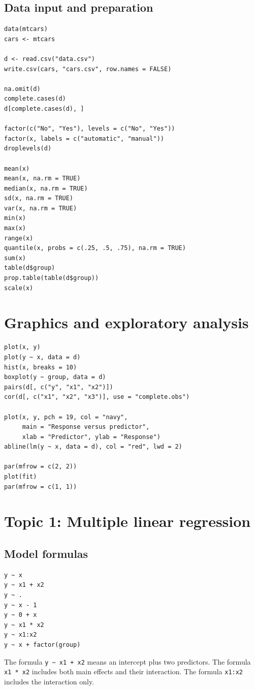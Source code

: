 \documentclass[11pt]{article}
\begin{document}
\subsection{Data input and preparation}
\begin{lstlisting}
data(mtcars)
cars <- mtcars

d <- read.csv("data.csv")
write.csv(cars, "cars.csv", row.names = FALSE)

na.omit(d)
complete.cases(d)
d[complete.cases(d), ]

factor(c("No", "Yes"), levels = c("No", "Yes"))
factor(x, labels = c("automatic", "manual"))
droplevels(d)

mean(x)
mean(x, na.rm = TRUE)
median(x, na.rm = TRUE)
sd(x, na.rm = TRUE)
var(x, na.rm = TRUE)
min(x)
max(x)
range(x)
quantile(x, probs = c(.25, .5, .75), na.rm = TRUE)
sum(x)
table(d$group)
prop.table(table(d$group))
scale(x)
\end{lstlisting}

\section{Graphics and exploratory analysis}

\begin{lstlisting}
plot(x, y)
plot(y ~ x, data = d)
hist(x, breaks = 10)
boxplot(y ~ group, data = d)
pairs(d[, c("y", "x1", "x2")])
cor(d[, c("x1", "x2", "x3")], use = "complete.obs")

plot(x, y, pch = 19, col = "navy",
     main = "Response versus predictor",
     xlab = "Predictor", ylab = "Response")
abline(lm(y ~ x, data = d), col = "red", lwd = 2)

par(mfrow = c(2, 2))
plot(fit)
par(mfrow = c(1, 1))
\end{lstlisting}

\section{Topic 1: Multiple linear regression}

\subsection{Model formulas}
\begin{lstlisting}
y ~ x
y ~ x1 + x2
y ~ .
y ~ x - 1
y ~ 0 + x
y ~ x1 * x2
y ~ x1:x2
y ~ x + factor(group)
\end{lstlisting}

The formula \texttt{y \textasciitilde{} x1 + x2} means an intercept plus
two predictors. The formula \texttt{x1 * x2} includes both main effects and
their interaction. The formula \texttt{x1:x2} includes the interaction only.
\end{document}
